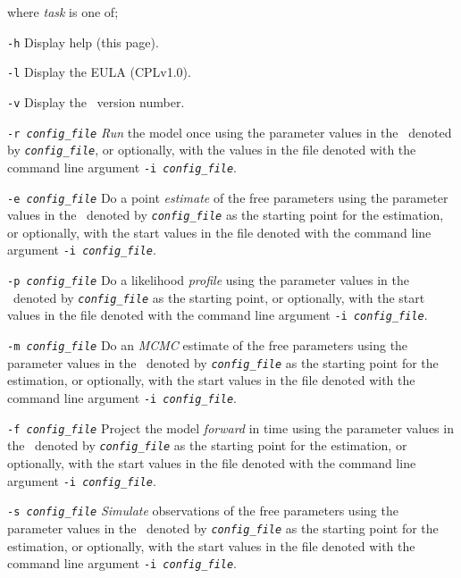 where \emph{task} is one of;
\begin{description}
\item \texttt{-h} Display help (this page).

\item \texttt{-l} Display the EULA (CPLv1.0).

\item \texttt{-v} Display the \SPM\ version number.

\item \texttt{-r \emph{config\_file}} \emph{Run} the model once using the parameter values in the \config\ denoted by \emph{\texttt{config\_file}}, or optionally, with the values in the file denoted with the command line argument \texttt{-i \emph{config\_file}}.

\item \texttt{-e \emph{config\_file}} Do a point \emph{estimate} of the free parameters using the parameter values in the \config\ denoted by \emph{\texttt{config\_file}} as the starting point for the estimation, or optionally, with the start values in the file denoted with the command line argument \texttt{-i \emph{config\_file}}.

\item \texttt{-p \emph{config\_file}} Do a likelihood \emph{profile} using the parameter values in the \config\ denoted by \emph{\texttt{config\_file}} as the starting point, or optionally, with the start values in the file denoted with the command line argument \texttt{-i \emph{config\_file}}.

\item \texttt{-m \emph{config\_file}} Do an \emph{MCMC} estimate of the free parameters using the parameter values in the \config\ denoted by \emph{\texttt{config\_file}} as the starting point for the estimation, or optionally, with the start values in the file denoted with the command line argument \texttt{-i \emph{config\_file}}.

\item \texttt{-f \emph{config\_file}} Project the model \emph{forward} in time using the parameter values in the \config\ denoted by \emph{\texttt{config\_file}} as the starting point for the estimation, or optionally, with the start values in the file denoted with the command line argument \texttt{-i \emph{config\_file}}.

\item \texttt{-s \emph{config\_file}} \emph{Simulate} observations of the free parameters using the parameter values in the \config\ denoted by \emph{\texttt{config\_file}} as the starting point for the estimation, or optionally, with the start values in the file denoted with the command line argument \texttt{-i \emph{config\_file}}.

\end{description}

